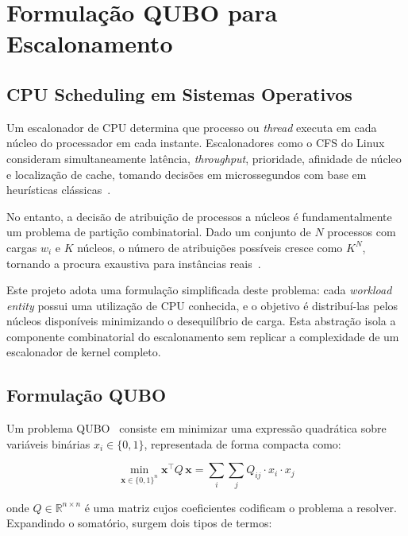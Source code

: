 \chapter{Formulação QUBO para Escalonamento}
\label{chap:formulacao-qubo-escalonamento}

\section{CPU Scheduling em Sistemas Operativos}
\label{sec:cpu-scheduling}

Um escalonador de \acs{CPU} determina que processo ou \textit{thread} executa em cada núcleo do processador
em cada instante. Escalonadores como o \ac{CFS} do Linux consideram
simultaneamente latência, \textit{throughput}, prioridade, afinidade de núcleo e localização de cache,
tomando decisões em microssegundos com base em heurísticas clássicas~\cite{LinuxCFS}.

No entanto, a decisão de atribuição de processos a núcleos é fundamentalmente um problema de partição combinatorial. Dado um conjunto de $N$ processos com cargas $w_i$ e $K$ núcleos, o número de atribuições possíveis cresce como $K^N$, tornando a procura exaustiva para instâncias reais~\cite{Kochenberger2014QUBO,Glover2019QUBO}.

Este projeto adota uma formulação simplificada deste problema: cada \textit{workload entity} possui
uma utilização de \acs{CPU} conhecida, e o objetivo é distribuí-las pelos núcleos disponíveis minimizando o
desequilíbrio de carga. Esta abstração isola a componente combinatorial do escalonamento sem replicar a complexidade de um escalonador de kernel completo.

\section{Formulação QUBO}
\label{sec:formulacao-qubo}

Um problema \acs{QUBO}~\cite{Kochenberger2014QUBO,Glover2019QUBO} consiste em minimizar
uma expressão quadrática sobre variáveis binárias $x_i \in \{0, 1\}$, representada de forma compacta como:

\begin{equation}
    \min_{\mathbf{x} \in \{0,1\}^n} \mathbf{x}^\top Q\, \mathbf{x} = \sum_{i} \sum_{j} Q_{ij} \cdot x_i \cdot x_j
\end{equation}

onde $Q \in \mathbb{R}^{n \times n}$ é uma matriz cujos coeficientes codificam o problema a resolver.
Expandindo o somatório, surgem dois tipos de termos:

